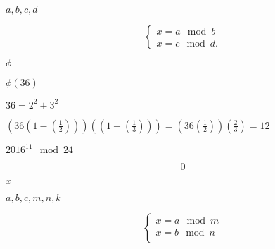 \documentclass[10pt]{book}
\begin{document}
\begin{mdSnippets}
\begin{mdInlineSnippet}
$a, b, c, d$\end{mdInlineSnippet}%
\begin{mdDisplaySnippet}[9ddaf010c06ad75e29c04815c282e105]%
\[%
\left\{\begin{array}{l}
x = a \mod b\\
x = c \mod d.
\end{array}\right.
\]%
\end{mdDisplaySnippet}%
\begin{mdInlineSnippet}[1ed346930917426bc46d41e22cc525ec]%
$\phi$\end{mdInlineSnippet}%
\begin{mdInlineSnippet}[d80df8daca17b91b658266cd0106e416]%
$\phi(36)$\end{mdInlineSnippet}%
\begin{mdInlineSnippet}[e94162e52281039d65d29c87b51c61d2]%
$36 = 2^2 + 3^2$\end{mdInlineSnippet}%
\begin{mdInlineSnippet}[85c00d666a8029c8369161ee63c0ccd9]%
$\left(36\left(1 - \left(\frac{1} {2}\right)\right)\right) \left(\left(1 - \left(\frac{1} {3}\right)\right)\right) = \left(36\left(\frac{1} {2} \right)\right) \left(\frac{2} {3} \right) = 12$\end{mdInlineSnippet}%
\begin{mdInlineSnippet}%
$2016^{11} \mod 24$\end{mdInlineSnippet}%
\begin{mdDisplaySnippet}[06cb4717b0ccefca776dd7000a51c7da]%
\[%
  0
\]%
\end{mdDisplaySnippet}%
\begin{mdInlineSnippet}[9dd4e461268c8034f5c8564e155c67a6]%
$x$\end{mdInlineSnippet}%
\begin{mdInlineSnippet}%
$a,b,c,m,n,k$\end{mdInlineSnippet}%
\begin{mdDisplaySnippet}[5552910c2be0f81d5df1a44fbea473e8]%
\[%
\left\{\begin{array}{l}
x = a \mod m\\
x = b \mod n\\

\end{array}\]
\end{mdDisplaySnippet}
\end{mdSnippets}
\end{document}

